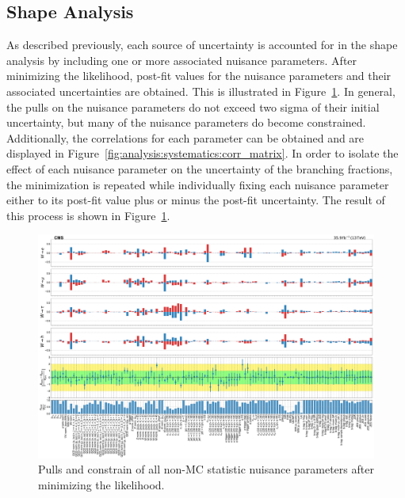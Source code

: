



\FloatBarrier



\subsection{Shape Analysis}

As described previously, each source of uncertainty is accounted for in
the shape analysis by including one or more associated nuisance
parameters.  After minimizing the likelihood, post-fit values for the
nuisance parameters and their associated uncertainties are obtained.
This is illustrated in Figure~\ref{fig:analysis:systematics:pulls_all}.  In general, the
pulls on the nuisance parameters do not exceed two sigma of their
initial uncertainty, but many of the nuisance parameters do become
constrained.  Additionally, the correlations for each parameter can be
obtained and are displayed in Figure~\ref{fig:analysis:systematics:corr_matrix}.  In order to
isolate the effect of each nuisance parameter on the uncertainty of the 
branching fractions, the minimization is repeated while individually fixing each
nuisance parameter either to its post-fit value plus or minus the
post-fit uncertainty.  The result of this process is shown in
Figure~\ref{fig:analysis:systematics:pulls_all}.

\begin{figure}
    \centering
    \includegraphics[width=\textwidth]{chapters/Analysis/sectionSystematics/figures/pulls_impacts_final.pdf}
    \caption{Pulls and constrain of all non-MC statistic nuisance
        parameters after minimizing the likelihood.}
    \label{fig:analysis:systematics:pulls_all}
\end{figure}

